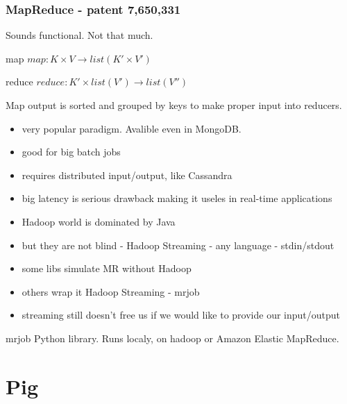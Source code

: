 \documentclass{beamer}
\begin{document}
\begin{frame}
    \frametitle{MapReduce - patent 7,650,331}
    Sounds functional. \pause Not that much.
    \begin{block}{map}
        $ map: K \times V \rightarrow list (K' \times V') $
    \end{block}
    \begin{block}{reduce}
        $ reduce: K' \times list(V') \rightarrow list (V'')$
    \end{block}

    Map output is sorted and grouped by keys to make proper input into reducers.

    \begin{itemize}
        \item very popular paradigm. Avalible even in MongoDB.
        \item good for big batch jobs
        \item requires distributed input/output, like Cassandra
        \item big latency is serious drawback making it useles in real-time applications
    \end{itemize}

\end{frame}



\begin{frame}
    \begin{itemize}
        \item Hadoop world is dominated by Java
            \pause
        \item but they are not blind - Hadoop Streaming - any language - stdin/stdout
        \item some libs simulate MR without Hadoop
        \item others wrap it Hadoop Streaming - mrjob
        \item streaming still doesn't free us if we would like to provide our input/output
    \end{itemize}
    \begin{block}{mrjob}
    Python library. Runs localy, on hadoop or Amazon Elastic MapReduce.
    \end{block}
\end{frame}


\begin{frame}
    
\end{frame}


\section{Pig}
\end{document}

